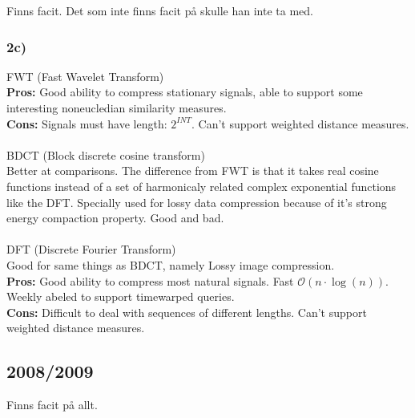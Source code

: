 \documentclass[12pt]{article}
\begin{document}
        Finns facit. Det som inte finns facit på skulle han inte ta med.
        
    \subsubsection*{2c)}
    
        FWT (Fast Wavelet Transform)\\
        \textbf{Pros:} Good ability to compress stationary signals, able to support some interesting noneucledian similarity measures.\\ 
        \textbf{Cons:} Signals must have length: $2^{INT}$. Can't support weighted distance measures.\\
        \\
        BDCT (Block discrete cosine transform)\\
        Better at comparisons. The difference from FWT is that it takes real cosine functions instead of a set of harmonicaly related complex
        exponential functions like the DFT. Specially used for lossy data compression because of it's strong energy compaction property. 
        Good and bad.\\
        \\
        DFT (Discrete Fourier Transform)\\
        Good for same things as BDCT, namely Lossy image compression.\\
        \textbf{Pros:} Good ability to compress most natural signals. Fast $\mathcal{O}(n \cdot \log(n))$. 
        Weekly abeled to support timewarped queries. \\
        \textbf{Cons:} Difficult to deal with sequences of different lengths. Can't support weighted distance measures.
        
\subsection*{2008/2009}

    Finns facit på allt.
\end{document}
